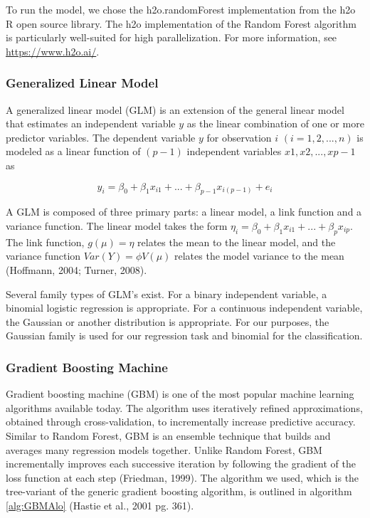 \documentclass[conference,final,]{IEEEtran}
\begin{document}
To run the model, we chose the h2o.randomForest implementation from the
h2o R open source library. The h2o implementation of the Random Forest
algorithm is particularly well-suited for high parallelization. For more
information, see \url{https://www.h2o.ai/}.

\hypertarget{generalized-linear-model}{%
\subsubsection{Generalized Linear
Model}\label{generalized-linear-model}}

A generalized linear model (GLM) is an extension of the general linear
model that estimates an independent variable \(y\) as the linear
combination of one or more predictor variables. The dependent variable
\(y\) for observation \(i\) \((i = 1, 2, ..., n)\) is modeled as a
linear function of \((p - 1)\) independent variables
\(x1, x2,... ,xp-1\) as

\[
y_i = \beta_0+\beta_1x_{i1}+...+\beta_{p-1}x_{i(p-1)}+e_i
\]

A GLM is composed of three primary parts: a linear model, a link
function and a variance function. The linear model takes the form
\(\eta_i = \beta_0+\beta_1x_{i1}+...+\beta_{p}x_{ip}\). The link
function, \(g(\mu)=\eta\) relates the mean to the linear model, and the
variance function \(Var(Y) = \phi V(\mu)\) relates the model variance to
the mean (Hoffmann, 2004; Turner, 2008).

Several family types of GLM's exist. For a binary independent variable,
a binomial logistic regression is appropriate. For a continuous
independent variable, the Gaussian or another distribution is
appropriate. For our purposes, the Gaussian family is used for our
regression task and binomial for the classification.

\hypertarget{gradient-boosting-machine}{%
\subsubsection{Gradient Boosting
Machine}\label{gradient-boosting-machine}}

Gradient boosting machine (GBM) is one of the most popular machine
learning algorithms available today. The algorithm uses iteratively
refined approximations, obtained through cross-validation, to
incrementally increase predictive accuracy. Similar to Random Forest,
GBM is an ensemble technique that builds and averages many regression
models together. Unlike Random Forest, GBM incrementally improves each
successive iteration by following the gradient of the loss function at
each step (Friedman, 1999). The algorithm we used, which is the
tree-variant of the generic gradient boosting algorithm, is outlined in
algorithm \ref{alg:GBMAlo} (Hastie et al., 2001 pg. 361).
\end{document}
